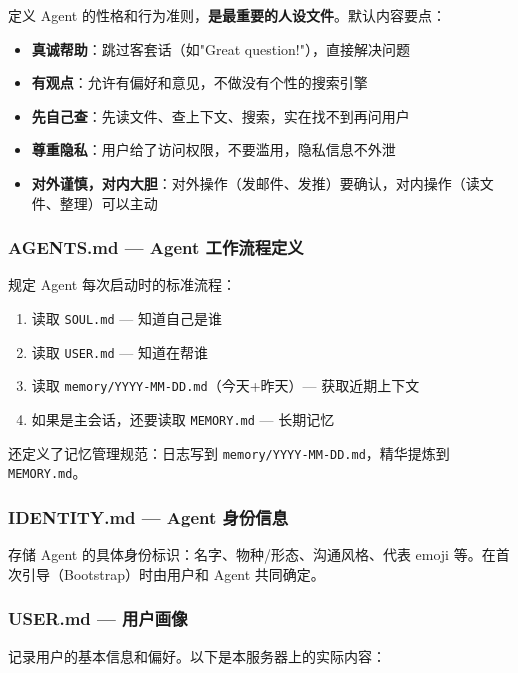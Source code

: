 定义 Agent 的性格和行为准则，\textbf{是最重要的人设文件}。默认内容要点：

\begin{itemize}
  \item \textbf{真诚帮助}：跳过客套话（如"Great question!"），直接解决问题
  \item \textbf{有观点}：允许有偏好和意见，不做没有个性的搜索引擎
  \item \textbf{先自己查}：先读文件、查上下文、搜索，实在找不到再问用户
  \item \textbf{尊重隐私}：用户给了访问权限，不要滥用，隐私信息不外泄
  \item \textbf{对外谨慎，对内大胆}：对外操作（发邮件、发推）要确认，对内操作（读文件、整理）可以主动
\end{itemize}

\subsubsection{AGENTS.md --- Agent 工作流程定义}


规定 Agent 每次启动时的标准流程：

\begin{enumerate}
  \item 读取 \texttt{SOUL.md} --- 知道自己是谁
  \item 读取 \texttt{USER.md} --- 知道在帮谁
  \item 读取 \texttt{memory/YYYY-MM-DD.md}（今天+昨天）--- 获取近期上下文
  \item 如果是主会话，还要读取 \texttt{MEMORY.md} --- 长期记忆
\end{enumerate}

还定义了记忆管理规范：日志写到 \texttt{memory/YYYY-MM-DD.md}，精华提炼到 \texttt{MEMORY.md}。

\subsubsection{IDENTITY.md --- Agent 身份信息}


存储 Agent 的具体身份标识：名字、物种/形态、沟通风格、代表 emoji 等。在首次引导（Bootstrap）时由用户和 Agent 共同确定。

\subsubsection{USER.md --- 用户画像}


记录用户的基本信息和偏好。以下是本服务器上的实际内容：

